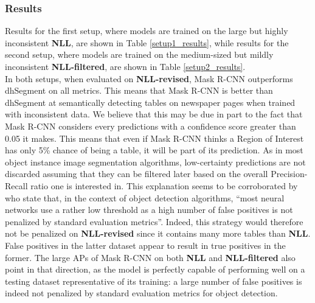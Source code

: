 \subsubsection{Results}
Results for the first setup, where models are trained on the large but highly inconsistent \textbf{NLL}, are shown in Table \ref{setup1_results}, while results for the second setup, where models are trained on the medium-sized but mildly inconsistent \textbf{NLL-filtered}, are shown in Table \ref{setup2_results}. \\
In both setups, when evaluated on \textbf{NLL-revised}, Mask R-CNN outperforms dhSegment on all metrics. This means that Mask R-CNN is better than dhSegment at semantically detecting tables on newspaper pages when trained with inconsistent data. We believe that this may be due in part to the fact that Mask R-CNN considers every predictions with a confidence score greater than 0.05 it makes. This means that even if Mask R-CNN thinks a Region of Interest has only 5\% chance of being a table, it will be part of its prediction. As in most object instance image segmentation algorithms, low-certainty predictions are not discarded assuming that they can be filtered later based on the overall Precision-Recall ratio one is interested in. This explanation seems to be corroborated by \citet{wenkel_confidence_2021} who state that, in the context of object detection algorithms, ``most neural networks use a rather low threshold as a high number of false positives is not penalized by standard evaluation metrics''. Indeed, this strategy would therefore not be penalized on \textbf{NLL-revised} since it contains many more tables than \textbf{NLL}. False positives in the latter dataset appear to result in true positives in the former. The large APs of Mask R-CNN on both \textbf{NLL} and \textbf{NLL-filtered} also point in that direction, as the model is perfectly capable of performing well on a testing dataset representative of its training: a large number of false positives is indeed not penalized by standard evaluation metrics for object detection.  \\
